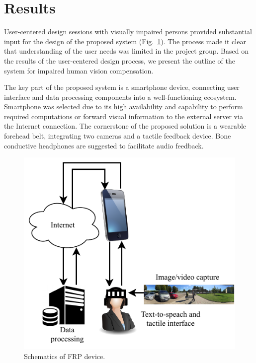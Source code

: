\documentclass[10pt,conference,compsocconf]{IEEEtran}
\begin{document}
\section{Results}
\label{sec:results}

User-centered design sessions with visually impaired persons provided substantial input for the design of the proposed system (Fig.~\ref{fig:schematics}). The process made it clear that understanding of the user needs was limited in the project group. Based on the results of the user-centered design process, we present the outline of the system for impaired human vision compensation. 

The key part of the proposed system is a smartphone device, connecting user interface and data processing components into a well-functioning ecosystem. Smartphone was selected due to its high availability and capability to perform required computations or forward visual information to the external server via the Internet connection. The cornerstone of the proposed solution is a wearable forehead belt, integrating two cameras and a tactile feedback device. Bone conductive headphones are suggested to facilitate audio feedback.

\begin{figure}
  \begin{center}
    \includegraphics[scale=0.7]{./img/cropped_diagram.pdf}  
  \end{center}
  \caption{Schematics of FRP device.}
  \label{fig:schematics}
\end{figure}
\end{document}

